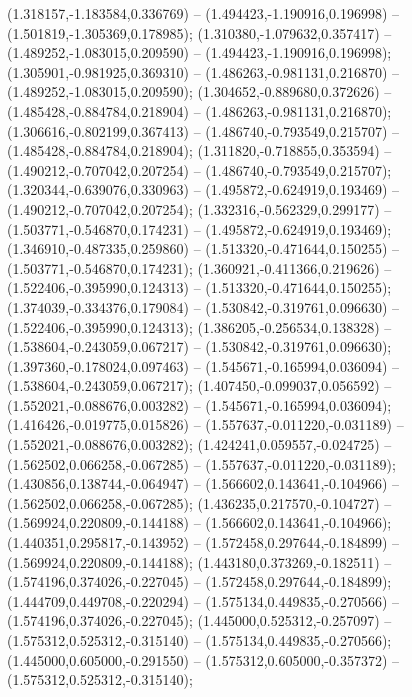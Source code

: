  (1.318157,-1.183584,0.336769) -- (1.494423,-1.190916,0.196998) -- (1.501819,-1.305369,0.178985);
 (1.310380,-1.079632,0.357417) -- (1.489252,-1.083015,0.209590) -- (1.494423,-1.190916,0.196998);
 (1.305901,-0.981925,0.369310) -- (1.486263,-0.981131,0.216870) -- (1.489252,-1.083015,0.209590);
 (1.304652,-0.889680,0.372626) -- (1.485428,-0.884784,0.218904) -- (1.486263,-0.981131,0.216870);
 (1.306616,-0.802199,0.367413) -- (1.486740,-0.793549,0.215707) -- (1.485428,-0.884784,0.218904);
 (1.311820,-0.718855,0.353594) -- (1.490212,-0.707042,0.207254) -- (1.486740,-0.793549,0.215707);
 (1.320344,-0.639076,0.330963) -- (1.495872,-0.624919,0.193469) -- (1.490212,-0.707042,0.207254);
 (1.332316,-0.562329,0.299177) -- (1.503771,-0.546870,0.174231) -- (1.495872,-0.624919,0.193469);
 (1.346910,-0.487335,0.259860) -- (1.513320,-0.471644,0.150255) -- (1.503771,-0.546870,0.174231);
 (1.360921,-0.411366,0.219626) -- (1.522406,-0.395990,0.124313) -- (1.513320,-0.471644,0.150255);
 (1.374039,-0.334376,0.179084) -- (1.530842,-0.319761,0.096630) -- (1.522406,-0.395990,0.124313);
 (1.386205,-0.256534,0.138328) -- (1.538604,-0.243059,0.067217) -- (1.530842,-0.319761,0.096630);
 (1.397360,-0.178024,0.097463) -- (1.545671,-0.165994,0.036094) -- (1.538604,-0.243059,0.067217);
 (1.407450,-0.099037,0.056592) -- (1.552021,-0.088676,0.003282) -- (1.545671,-0.165994,0.036094);
 (1.416426,-0.019775,0.015826) -- (1.557637,-0.011220,-0.031189) -- (1.552021,-0.088676,0.003282);
 (1.424241,0.059557,-0.024725) -- (1.562502,0.066258,-0.067285) -- (1.557637,-0.011220,-0.031189);
 (1.430856,0.138744,-0.064947) -- (1.566602,0.143641,-0.104966) -- (1.562502,0.066258,-0.067285);
 (1.436235,0.217570,-0.104727) -- (1.569924,0.220809,-0.144188) -- (1.566602,0.143641,-0.104966);
 (1.440351,0.295817,-0.143952) -- (1.572458,0.297644,-0.184899) -- (1.569924,0.220809,-0.144188);
 (1.443180,0.373269,-0.182511) -- (1.574196,0.374026,-0.227045) -- (1.572458,0.297644,-0.184899);
 (1.444709,0.449708,-0.220294) -- (1.575134,0.449835,-0.270566) -- (1.574196,0.374026,-0.227045);
 (1.445000,0.525312,-0.257097) -- (1.575312,0.525312,-0.315140) -- (1.575134,0.449835,-0.270566);
 (1.445000,0.605000,-0.291550) -- (1.575312,0.605000,-0.357372) -- (1.575312,0.525312,-0.315140);

